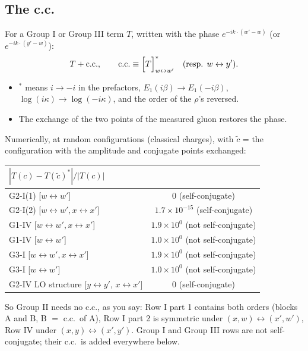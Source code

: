 \documentclass[10pt]{article}
\numberwithin{equation}{section}
\newcommand{\phw}{e^{-ik\cdot(w'-w)}}
\begin{document}
\subsection{The c.c.}\label{sec:cc}
For a Group I or Group III term $T$, written with the phase $\phw$ (or $e^{-ik\cdot(y'-w)}$):
\begin{equation*}
T+{\rm c.c.},\qquad {\rm c.c.}\equiv\Big[T\Big]^*_{w\leftrightarrow w'}\quad(\text{resp. }w\leftrightarrow y').
\end{equation*}
\begin{itemize}
\item $^*$ means $i\to-i$ in the prefactors, $E_1(i\beta)\to E_1(-i\beta)$, $\log(i\kappa)\to\log(-i\kappa)$, and the order of the $\rho$'s reversed.
\item The exchange of the two points of the measured gluon restores the phase.
\end{itemize}
Numerically, at random configurations (classical charges), with $\tilde c$ = the configuration with the amplitude and conjugate points exchanged:
\begin{center}\small
\begin{tabular}{@{}lc@{}}\toprule
$|T(c)-T(\tilde c)^*|/|T(c)|$ & \\\midrule
G2-I(1)  [$w\leftrightarrow w'$] & $0$ (self-conjugate)\\
G2-I(2)  [$w\leftrightarrow w', x\leftrightarrow x'$] & $1.7\times10^{-15}$ (self-conjugate)\\
G1-IV    [$w\leftrightarrow w', x\leftrightarrow x'$] & $1.9\times10^{0}$ (not self-conjugate)\\
G1-IV    [$w\leftrightarrow w'$] & $1.0\times10^{0}$ (not self-conjugate)\\
G3-I     [$w\leftrightarrow w', x\leftrightarrow x'$] & $1.9\times10^{0}$ (not self-conjugate)\\
G3-I     [$w\leftrightarrow w'$] & $1.0\times10^{0}$ (not self-conjugate)\\
G2-IV LO structure [$y\leftrightarrow y'$, $x\leftrightarrow x'$] & $0$ (self-conjugate)\\
\bottomrule
\end{tabular}
\end{center}
So Group II needs no c.c., as you say: Row I part 1 contains both orders (blocks A and B, B $=$ c.c.\ of A), Row I part 2 is symmetric under $(x,w)\leftrightarrow(x',w')$, Row IV under $(x,y)\leftrightarrow(x',y')$. Group I and Group III rows are not self-conjugate; their c.c.\ is added everywhere below.
\end{document}

